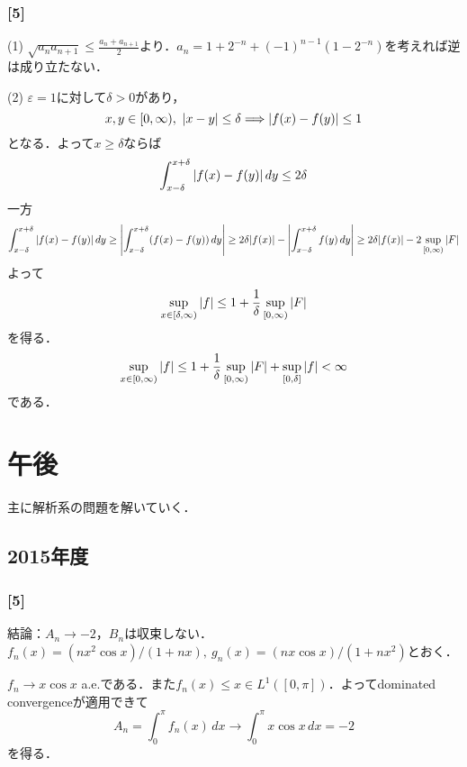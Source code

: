 \documentclass[a4j]{ltjsarticle}
\newcommand{\1}{\mathbbm{1}}
\numberwithin{equation}{section}
\theoremstyle{definition}
\begin{document}
\subsubsection*{[5]}
(1) $\sqrt{a_na_{n+1}}\leq \frac{a_n+a_{n+1}}{2}$より．$a_n=1+2^{-n}+(-1)^{n-1}(1-2^{-n})$を考えれば逆は成り立たない．

(2) $\varepsilon=1$に対して$\delta>0$があり，
\begin{equation}
    x,y\in [0,\infty),\ \abs{x-y}\leq \delta\Longrightarrow \abs{f(x)-f(y)}\leq 1 
\end{equation}
となる．よって$x\geq \delta$ならば
\begin{equation}
    \int_{x-\delta}^{x+\delta}\abs{f(x)-f(y)}\,dy\leq 2\delta
\end{equation}
一方
\begin{equation}
    \int_{x-\delta}^{x+\delta}\abs{f(x)-f(y)}\,dy\geq \abs{\int_{x-\delta}^{x+\delta}(f(x)-f(y))\,dy}\geq2\delta\abs{f(x)}-\abs{\int_{x-\delta}^{x+\delta}f(y)\,dy}\geq 2\delta\abs{f(x)}-2\sup_{[0,\infty)}\abs{F}
\end{equation}
よって
\begin{equation}
    \sup_{x\in[\delta,\infty)}\abs{f}\leq 1+\frac{1}{\delta}\sup_{[0,\infty)}\abs{F}
\end{equation}
を得る．
\begin{equation}
    \sup_{x\in[0,\infty)}\abs{f}\leq 1+\frac{1}{\delta}\sup_{[0,\infty)}\abs{F}+\sup_{[0,\delta]}\abs{f}<\infty 
\end{equation}
である．

\section{午後}
主に解析系の問題を解いていく．
\subsection{2015年度}
\subsubsection*{[5]}
結論：$A_n\to -2$，$B_n$は収束しない．$f_n(x)=(nx^2\cos x)/(1+nx),\ g_n(x)=(nx\cos x)/(1+nx^2)$とおく．

$f_n\to x\cos x$ a.e.である．また$f_n(x)\leq x\in L^1([0,\pi])$．よってdominated convergenceが適用できて
\begin{equation}
    A_n=\int_{0}^{\pi}f_n(x)\,dx\to \int_{0}^{\pi}x\cos x\,dx=-2
\end{equation}
を得る．
\end{document}
